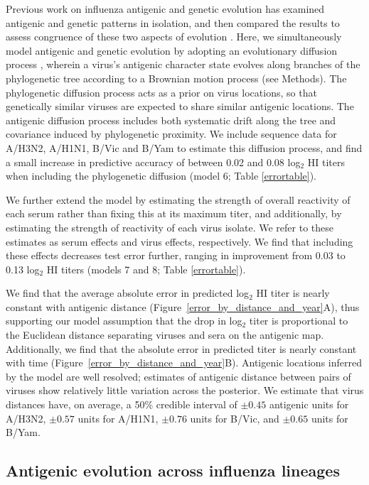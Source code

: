\documentclass[11pt,oneside,letterpaper]{article}
\begin{document}
Previous work on influenza antigenic and genetic evolution has examined antigenic and genetic patterns in isolation, and then compared the results to assess congruence of these two aspects of evolution \cite{Hay01, Smith04, Russell08}. 
Here, we simultaneously model antigenic and genetic evolution by adopting an evolutionary diffusion process \cite{Lemey10}, wherein a virus's antigenic character state evolves along branches of the phylogenetic tree according to a Brownian motion process (see Methods).
The phylogenetic diffusion process acts as a prior on virus locations, so that genetically similar viruses are expected to share similar antigenic locations.
The antigenic diffusion process includes both systematic drift along the tree and covariance induced by phylogenetic proximity.
We include sequence data for A/H3N2, A/H1N1, B/Vic and B/Yam to estimate this diffusion process, and find a small increase in predictive accuracy of between 0.02 and 0.08 log$_2$ HI titers when including the phylogenetic diffusion (model 6; Table \ref{errortable}).

We further extend the model by estimating the strength of overall reactivity of each serum rather than fixing this at its maximum titer, and additionally, by estimating the strength of reactivity of each virus isolate.
We refer to these estimates as serum effects and virus effects, respectively.
We find that including these effects decreases test error further, ranging in improvement from 0.03 to 0.13 log$_2$ HI titers (models 7 and 8; Table \ref{errortable}).

We find that the average absolute error in predicted log$_2$ HI titer is nearly constant with antigenic distance (Figure~\ref{error_by_distance_and_year}A), thus supporting our model assumption that the drop in log$_2$ titer is proportional to the Euclidean distance separating viruses and sera on the antigenic map.
Additionally, we find that the absolute error in predicted titer is nearly constant with time (Figure~\ref{error_by_distance_and_year}B).
Antigenic locations inferred by the model are well resolved; estimates of antigenic distance between pairs of viruses show relatively little variation across the posterior.
We estimate that virus distances have, on average, a 50\% credible interval of $\pm0.45$ antigenic units for A/H3N2, $\pm0.57$ units for A/H1N1, $\pm0.76$ units for B/Vic, and $\pm0.65$ units for B/Yam.

\subsection*{Antigenic evolution across influenza lineages}
\end{document}
